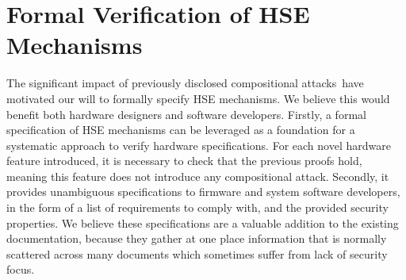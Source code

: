 \section{Formal Verification of HSE Mechanisms}
\label{sec:intro:verif}

The significant impact of previously disclosed compositional
attacks\,\cite{duflot2009smram,wojtczuk2009smram,domas2015sinkhole,kallenberg2015racecondition,kovah2015senter}
have motivated our will to formally specify  HSE mechanisms.
%
We believe this would benefit both hardware designers and software developers.
%
Firstly, a formal specification of HSE mechanisms can be leveraged as a
foundation for a systematic approach to verify hardware specifications.
%
For each novel hardware feature introduced, it is necessary to check that the
previous proofs hold, meaning this feature does not introduce any compositional
attack.
%
Secondly, it provides unambiguous specifications to firmware and system software
developers, in the form of a list of requirements to comply with, and the
provided security properties.
%
We believe these specifications are a valuable addition to the existing
documentation, because they gather at one place information that is normally
scattered across many documents which sometimes suffer from lack of security
focus.
%
%


